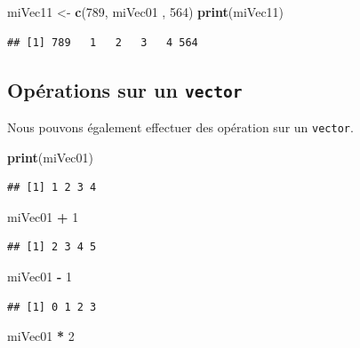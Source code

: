 \documentclass[]{book}
\newenvironment{Shaded}{\begin{snugshade}}{\end{snugshade}}
\newcommand{\KeywordTok}[1]{\textcolor[rgb]{0.13,0.29,0.53}{\textbf{#1}}}
\newcommand{\DecValTok}[1]{\textcolor[rgb]{0.00,0.00,0.81}{#1}}
\newcommand{\StringTok}[1]{\textcolor[rgb]{0.31,0.60,0.02}{#1}}
\newcommand{\OperatorTok}[1]{\textcolor[rgb]{0.81,0.36,0.00}{\textbf{#1}}}
\newcommand{\NormalTok}[1]{#1}
\begin{document}
\begin{Shaded}
\begin{Highlighting}[]
\NormalTok{miVec11 <-}\StringTok{ }\KeywordTok{c}\NormalTok{(}\DecValTok{789}\NormalTok{, miVec01 , }\DecValTok{564}\NormalTok{)}
\KeywordTok{print}\NormalTok{(miVec11)}
\end{Highlighting}
\end{Shaded}

\begin{verbatim}
## [1] 789   1   2   3   4 564
\end{verbatim}

\subsection{\texorpdfstring{Opérations sur un
\texttt{vector}}{Opérations sur un vector}}\label{operations-sur-un-vector}

Nous pouvons également effectuer des opération sur un \texttt{vector}.

\begin{Shaded}
\begin{Highlighting}[]
\KeywordTok{print}\NormalTok{(miVec01)}
\end{Highlighting}
\end{Shaded}

\begin{verbatim}
## [1] 1 2 3 4
\end{verbatim}

\begin{Shaded}
\begin{Highlighting}[]
\NormalTok{miVec01 }\OperatorTok{+}\StringTok{ }\DecValTok{1}
\end{Highlighting}
\end{Shaded}

\begin{verbatim}
## [1] 2 3 4 5
\end{verbatim}

\begin{Shaded}
\begin{Highlighting}[]
\NormalTok{miVec01 }\OperatorTok{-}\StringTok{ }\DecValTok{1}
\end{Highlighting}
\end{Shaded}

\begin{verbatim}
## [1] 0 1 2 3
\end{verbatim}

\begin{Shaded}
\begin{Highlighting}[]
\NormalTok{miVec01 }\OperatorTok{*}\StringTok{ }\DecValTok{2}
\end{Highlighting}
\end{Shaded}
\end{document}
